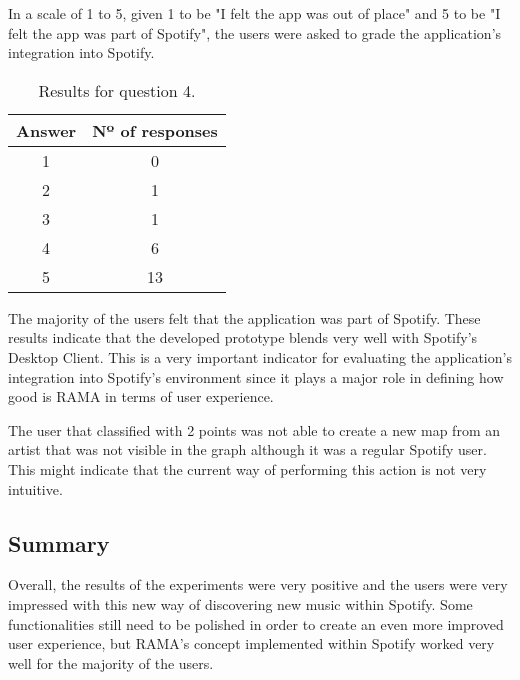       In a scale of 1 to 5, given 1 to be "I felt the app was out of place" and 5 to be "I felt the app was part of Spotify", the users were asked to grade the application's integration into Spotify.

      \begin{table}[hb]
        \begin{center}
          \begin{tabular}{c|c}

            \hline
            \textbf{Answer} & \textbf{Nº of responses} \\
            \hline
            1 & 0 \\
            2 & 1 \\
            3 & 1 \\
            4 & 6 \\
            5 & 13 \\
            \hline
          \end{tabular}
        \end{center}
        \caption{Results for question 4.}
        \label{tab:question4}
       \end{table}

      The majority of the users felt that the application was part of Spotify.
      These results indicate that the developed prototype blends very well with Spotify's Desktop Client.
      This is a very important indicator for evaluating the application's integration into Spotify's environment since it plays a major role in defining how good is RAMA in terms of user experience.

      The user that classified with 2 points was not able to create a new map from an artist that was not visible in the graph although it was a regular Spotify user.
      This might indicate that the current way of performing this action is not very intuitive.
  

  \subsection{Summary}

    Overall, the results of the experiments were very positive and the users were very impressed with this new way of discovering new music within Spotify.
    Some functionalities still need to be polished in order to create an even more improved user experience, but RAMA's concept implemented within Spotify worked very well for the majority of the users.
  
